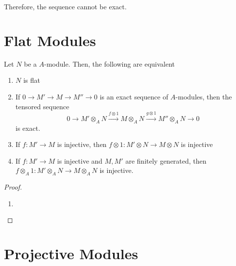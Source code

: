 Therefore, the sequence cannot be exact.

\section{Flat Modules}

\begin{definition}
\end{definition}

\begin{theorem}
    Let $N$ be a $A$-module. Then, the following are equivalent 
    \begin{enumerate}[label=(\alph*)]
        \item $N$ is flat 
        \item If $0\rightarrow M'\rightarrow M\rightarrow M''\rightarrow 0$ is an exact sequence of $A$-modules, then the tensored sequence 
        \begin{equation*}
        0\longrightarrow M'\otimes_A N\stackrel{f\otimes 1}{\longrightarrow} M\otimes_A N\stackrel{g\otimes 1}{\longrightarrow} M''\otimes_A N\longrightarrow 0
        \end{equation*}
        is exact.
        \item If $f: M'\to M$ is injective, then $f\otimes 1: M'\otimes N\to M\otimes N$ is injective 
        \item If $f: M'\to M$ is injective and $M,M'$ are finitely generated, then $f\otimes_A 1: M'\otimes_A N\to M\otimes_A N$ is injective.
    \end{enumerate}
\end{theorem}
\begin{proof}
\hfill 
\begin{enumerate}[label=(\alph*)]
\item 
\end{enumerate}
\end{proof}

\section{Projective Modules}

